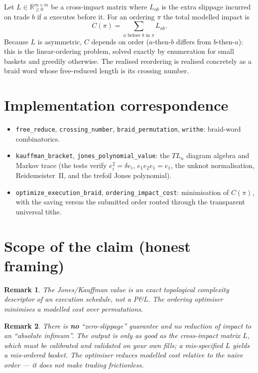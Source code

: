 \documentclass[11pt]{article}
\newtheorem{remark}{Remark}
\begin{document}
Let $L\in\mathbb{R}^{m\times m}_{\ge 0}$ be a cross-impact matrix where $L_{ab}$ is
the extra slippage incurred on trade $b$ if $a$ executes before it. For an ordering
$\pi$ the total modelled impact is
\begin{equation}
C(\pi) = \sum_{a \text{ before } b \text{ in } \pi} L_{ab}.
\end{equation}
Because $L$ is asymmetric, $C$ depends on order ($a$-then-$b$ differs from
$b$-then-$a$): this is the linear-ordering problem, solved exactly by enumeration
for small baskets and greedily otherwise. The realised reordering is realised
concretely as a braid word whose free-reduced length is its crossing number.

\section*{Implementation correspondence}

\begin{itemize}
\item \texttt{free\_reduce}, \texttt{crossing\_number}, \texttt{braid\_permutation},
\texttt{writhe}: braid-word combinatorics.
\item \texttt{kauffman\_bracket}, \texttt{jones\_polynomial\_value}: the $TL_n$
diagram algebra and Markov trace (the tests verify $e_i^2=\delta e_i$,
$e_1 e_2 e_1 = e_1$, the unknot normalisation, Reidemeister~II, and the trefoil
Jones polynomial).
\item \texttt{optimize\_execution\_braid}, \texttt{ordering\_impact\_cost}:
minimisation of $C(\pi)$, with the saving versus the submitted order routed
through the transparent universal tithe.
\end{itemize}

\section*{Scope of the claim (honest framing)}

\begin{remark}
The Jones/Kauffman value is an exact topological \emph{complexity descriptor} of
an execution schedule, not a P\&L. The ordering optimiser minimises a
\emph{modelled} cost over permutations.
\end{remark}

\begin{remark}
There is \textbf{no} ``zero-slippage'' guarantee and no reduction of impact to an
``absolute infimum''. The output is only as good as the cross-impact matrix $L$,
which must be calibrated and validated on your own fills; a mis-specified $L$
yields a mis-ordered basket. The optimiser reduces modelled cost relative to the
naive order --- it does not make trading frictionless.
\end{remark}
\end{document}
